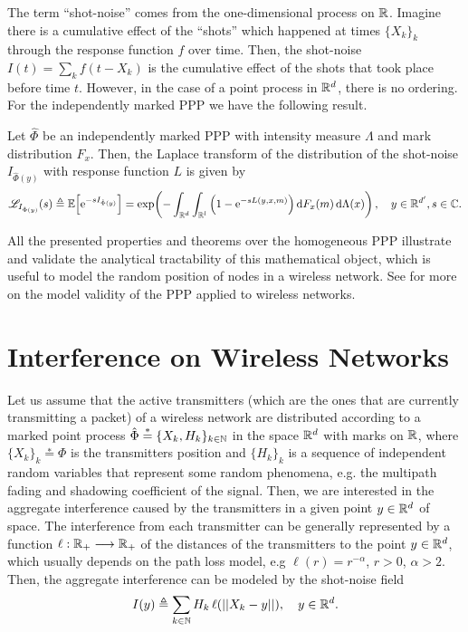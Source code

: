 The term ``shot-noise'' comes from the one-dimensional process on ${\mathbb R}$. Imagine there is a cumulative effect of the ``shots'' which happened at times $\{X_k\}_k$ through the response function $f$ over time. Then, the shot-noise $I(t) = \sum_k f(t-X_k)$ is the cumulative effect of the shots that took place before time $t$.
%
However, in the case of a point process in ${\mathbb R}^d$, there is no ordering.
%
For the independently marked PPP we have the following result.
\begin{theorem} \label{th:Laplace_PPP_shot-noise}
     Let $\hat\Phi$ be an independently marked PPP with intensity measure $\Lambda$ and mark distribution $F_x$. Then, the Laplace transform of the distribution of the shot-noise $I_{\hat\Phi(y)}$ with response function $L$ is given by
     \begin{align*}
         \mathscr{L}_{I_{\hat\Phi(y)}}(s) \triangleq {\mathbb E}\!\left[\mathrm{e}^{-s I_{\hat\Phi(y)}}\right] = \exp\!\left( -\int_{{\mathbb R}^d}\int_{{\mathbb R}^l}\left( 1 - \mathrm{e}^{-s L(y,x,m)}\right) \mathrm{d} F_x(m)\,\mathrm{d}\Lambda(x) \right), \quad y\in{\mathbb R}^{d'}, s\in{\mathbb C}.
     \end{align*}
\end{theorem}

All the presented properties and theorems over the homogeneous PPP illustrate and validate the analytical tractability of this mathematical object, which is useful to model the random position of nodes in a wireless network.
%
See \cite{lee2013stochastic} for more on the model validity of the PPP applied to wireless networks.

\section{Interference on Wireless Networks} \label{sec:P1_03_02}

Let us assume that the active transmitters (which are the ones that are currently transmitting a packet) of a wireless network are distributed according to a marked point process $\hat\Phi \stackrel{*}{=}\{X_k, H_k\}_{k\in{\mathbb N}}$ in the space ${\mathbb R}^d$ with marks on ${\mathbb R}$, where $\{X_k\}_k \stackrel{*}{=} \Phi$ is the transmitters position and $\{H_k\}_k$ is a sequence of independent random variables that represent some random phenomena, e.g. the multipath fading and shadowing coefficient of the signal.
%
Then, we are interested in the aggregate interference caused by the transmitters in a given point $y\in{\mathbb R}^d$ of space.
%
The interference from each transmitter can be generally represented by a function $\ell:{\mathbb R}_+\longrightarrow{\mathbb R}_+$ of the distances of the transmitters to the point $y\in{\mathbb R}^d$, which usually depends on the path loss model, e.g $\ell(r) = r^{-\alpha}$, $r>0$, $\alpha > 2$.
%
Then, the aggregate interference can be modeled by the shot-noise field
\begin{align} \label{eq:shot-noise_interference}
    I(y) \triangleq \sum_{k\in{\mathbb N}} H_k\,\ell(||X_k-y||), \quad y\in{\mathbb R}^d.
\end{align}

